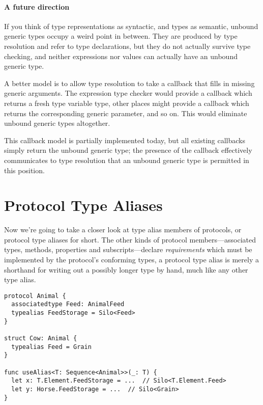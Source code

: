 \documentclass[../generics]{subfiles}
\begin{document}
\paragraph{A future direction} If you think of type representations as syntactic, and types as semantic, unbound generic types occupy a weird point in between. They are produced by type resolution and refer to type declarations, but they do not actually survive type checking, and neither expressions nor values can actually have an unbound generic type.

A better model is to allow type resolution to take a callback that fills in missing generic arguments. The expression type checker would provide a callback which returns a fresh type variable type, other places might provide a callback which returns the corresponding generic parameter, and so on. This would eliminate unbound generic types altogether.

This callback model is partially implemented today, but all existing callbacks simply return the unbound generic type; the presence of the callback effectively communicates to type resolution that an unbound generic type is permitted in this position.

\section{Protocol Type Aliases}\label{protocol type alias}

Now we're going to take a closer look at type alias members of protocols, or protocol type aliases for short. The other kinds of protocol members---associated types, methods, properties and subscripts---declare \emph{requirements} which must be implemented by the protocol's conforming types, a protocol type alias is merely a shorthand for writing out a possibly longer type by hand, much like any other type alias.

\begin{listing}\label{dependent protocol type alias listing}
\begin{Verbatim}
protocol Animal {
  associatedtype Feed: AnimalFeed
  typealias FeedStorage = Silo<Feed>
}

struct Cow: Animal {
  typealias Feed = Grain
}

func useAlias<T: Sequence<Animal>>(_: T) {
  let x: T.Element.FeedStorage = ...  // Silo<T.Element.Feed>
  let y: Horse.FeedStorage = ...  // Silo<Grain>
}
\end{Verbatim}
\end{listing}
\end{document}
